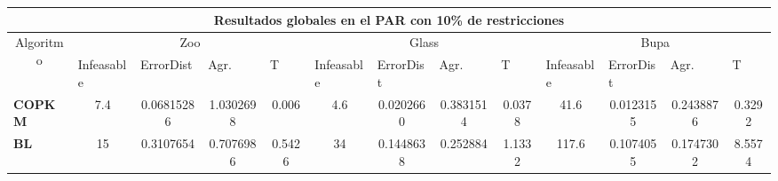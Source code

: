\begin{table}[H]
	\scriptsize

	\begin{adjustwidth}{-1cm}{-1cm}%
	
	\begin{tabular}{|l|c|c|c|c|c|c|c|c|c|c|c|c|}
	\hline
	\multicolumn{13}{|c|}{\textbf{Resultados globales en el PAR con 10\% de restricciones}}                                                                                                                                                                                                                                                                                                                                            \\ \hline
	\multicolumn{1}{|c|}{\multirow{2}{*}{Algoritmo}} & \multicolumn{4}{c|}{Zoo}                                                                                          & \multicolumn{4}{c|}{Glass}                                                                                         & \multicolumn{4}{c|}{Bupa}                                                                                          \\ \cline{2-13} 
	\multicolumn{1}{|c|}{}                                  & \multicolumn{1}{l|}{Infeasable} & \multicolumn{1}{l|}{ErrorDist} & \multicolumn{1}{l|}{Agr.} & \multicolumn{1}{l|}{T} & \multicolumn{1}{l|}{Infeasable} & \multicolumn{1}{l|}{ErrorDist} & \multicolumn{1}{l|}{Agr.} & \multicolumn{1}{l|}{T} & \multicolumn{1}{l|}{Infeasable} & \multicolumn{1}{l|}{ErrorDist} & \multicolumn{1}{l|}{Agr.} & \multicolumn{1}{l|}{T} \\ \hline
	\textbf{COPKM}      & 7.4 & 0.06815286 & 1.0302698 & 0.006		& 4.6 & 0.0202660 & 0.3831514 & 0.0378     & 41.6 & 0.0123155 & 0.2438876 & 0.3292  \\ \hline
	\textbf{BL}    & 15 & 0.3107654  & 0.7076986 & 0.5426 & 34 & 0.1448638 & 0.252884 & 1.1332 			& 117.6 & 0.1074055 & 0.1747302 & 8.5574		\\ \hline
	\end{tabular}
	
	\end{adjustwidth}
	
\end{table}	


